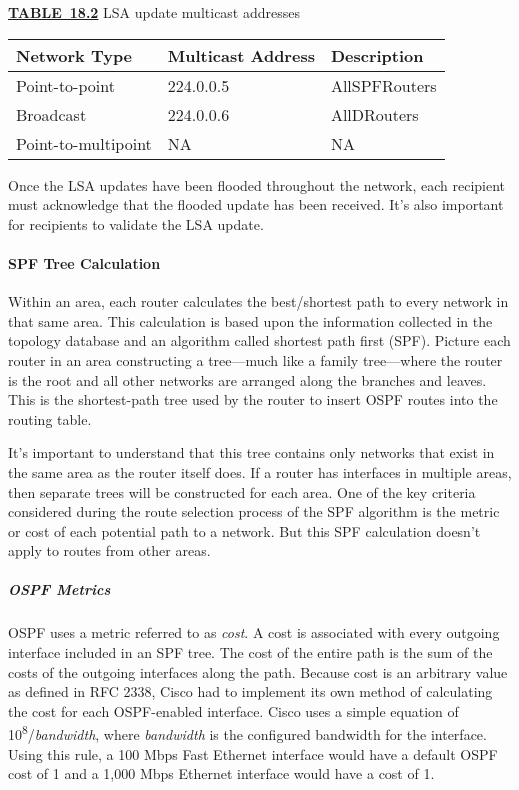 {\protect\hyperlink{c18.xhtmlux5cux23tableanchor18-2}{\textbf{TABLE~18.2}}
LSA update multicast addresses}

\begin{longtable}[]{@{}lll@{}}
\toprule
Network Type & Multicast Address & Description\tabularnewline
\midrule
\endhead
Point-to-point & 224.0.0.5 & AllSPFRouters\tabularnewline
Broadcast & 224.0.0.6 & AllDRouters\tabularnewline
Point-to-multipoint & NA & NA\tabularnewline
\bottomrule
\end{longtable}

Once the LSA updates have been flooded throughout the network, each
recipient must acknowledge that the flooded update has been received.
It's also important for recipients to validate the LSA update.

\paragraph{SPF Tree Calculation}

Within an area, each router calculates the best/shortest path to every
network in that same area. This calculation is based upon the
information collected in the topology database and an algorithm called
shortest path first (SPF). Picture each router in an area constructing a
tree---much like a family tree---where the router is the root and all
other networks are arranged along the branches and leaves. This is the
shortest-path tree used by the router to insert OSPF routes into the
routing table.

It's important to understand that this tree contains only networks that
exist in the same area as the router itself does. If a router has
interfaces in multiple areas, then separate trees will be constructed
for each area. One of the key criteria considered during the route
selection process of the SPF algorithm is the metric or cost of each
potential path to a network. But this SPF calculation doesn't apply to
routes from other areas.

\subparagraph[OSPF
Metrics]{\texorpdfstring{\protect\hypertarget{c18.xhtmlux5cux23c18-sec-4}{}{}\protect\hypertarget{c18.xhtmlux5cux23Page_753}{}{}OSPF
Metrics}{OSPF Metrics}}

OSPF uses a metric referred to as \emph{cost}. A cost is associated with
every outgoing interface included in an SPF tree. The cost of the entire
path is the sum of the costs of the outgoing interfaces along the path.
Because cost is an arbitrary value as defined in RFC 2338, Cisco had to
implement its own method of calculating the cost for each OSPF-enabled
interface. Cisco uses a simple equation of
10\textsuperscript{8}/\emph{bandwidth}, where \emph{bandwidth} is the
configured bandwidth for the interface. Using this rule, a 100 Mbps Fast
Ethernet interface would have a default OSPF cost of 1 and a 1,000 Mbps
Ethernet interface would have a cost of 1.

